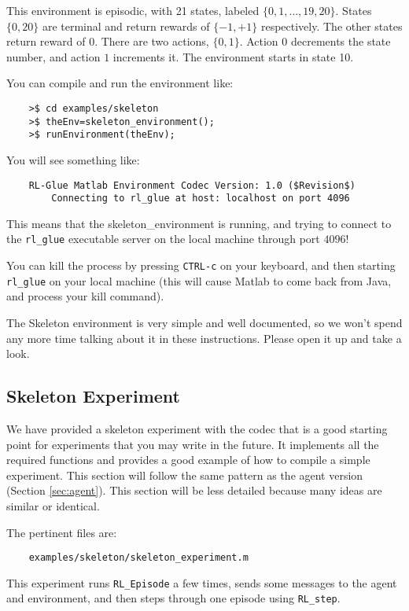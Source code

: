 \documentclass[11pt]{article}
\begin{document}
This environment is episodic, with 21 states, labeled $\{0, 1,\ldots,19,20\}$. States $\{0, 20\}$ are terminal and return rewards of $\{-1, +1\}$ respectively.  The other states return reward of $0$.
There are two actions, $\{0, 1\}$.  Action $0$ decrements the state number, and action $1$ increments it. The environment starts in state 10.

You can compile and run the environment like:
\begin{verbatim}
	>$ cd examples/skeleton
	>$ theEnv=skeleton_environment();
	>$ runEnvironment(theEnv);
\end{verbatim}

You will see something like:
\begin{verbatim}
	RL-Glue Matlab Environment Codec Version: 1.0 ($Revision$)
	    Connecting to rl_glue at host: localhost on port 4096
	\end{verbatim}

This means that the skeleton\_environment is running, and trying to connect to the \texttt{rl\_glue} executable server on the local machine through port $4096$! 

You can kill the process by pressing \texttt{CTRL-c} on your keyboard, and then starting  \texttt{rl\_glue} on your local machine (this will cause Matlab to come back from Java, and 
process your kill command).

The Skeleton environment is very simple and well documented, so we won't spend any more time talking about it in these instructions.
Please open it up and take a look.


\subsection{Skeleton Experiment}
We have provided a skeleton experiment with the codec that is a good starting point for experiments that you may write in the future.
It implements all the required functions and provides a good example of how to compile a simple experiment.  This section will follow the same 
pattern as the agent version (Section \ref{sec:agent}).  This section will be less detailed because many ideas are similar or identical.

The pertinent files are:
\begin{verbatim}
	examples/skeleton/skeleton_experiment.m
\end{verbatim}

This experiment runs \texttt{RL\_Episode} a few times, sends some messages to the agent and environment, and then steps through one episode using \texttt{RL\_step}.
\end{document}
